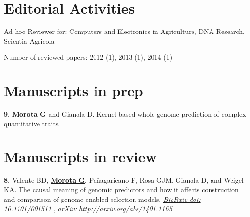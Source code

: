 \documentclass[margin,line,10pt]{res}
\newenvironment{list1}{
  \begin{list}{\ding{113}}{%
      \setlength{\itemsep}{0in}
      \setlength{\parsep}{0in} \setlength{\parskip}{0in}
      \setlength{\topsep}{0in} \setlength{\partopsep}{0in} 
      \setlength{\leftmargin}{0.17in}}}{\end{list}}
\begin{document}
\begin{resume}
\vspace{0.5cm}
\section{\sc Editorial Activities}
\vspace{.1cm}
Ad hoc Reviewer for: Computers and Electronics in Agriculture, DNA Research, Scientia Agricola
\vspace{.1cm}

Number of reviewed papers:
2012 (1), 2013 (1), 2014 (1) 


\vspace{0.5cm}
\section{\sc Manuscripts in prep}


\begin{list1}
\item [{\bf 9}.]  {\bf \underline{Morota G}} and Gianola D.   
     Kernel-based whole-genome prediction of complex quantitative traits. %


\end{list1}


\vspace{0.5cm}


\section{\sc Manuscripts in review}
\begin{list1}

\item [{\bf 8}.]  Valente BD, {\bf \underline{Morota G}}, Pe\~{n}agaricano F, Rosa GJM, Gianola D, and Weigel KA.   
     The causal meaning of genomic predictors and how it affects  construction and  
     comparison of genome-enabled selection models. 
\textcolor{blue}{\href{http://biorxiv.org/content/early/2013/12/21/001511}{{\it BioRxiv doi: 10.1101/001511 }}},  %
\hspace{2.7pt} \textcolor{blue}{\href{http://arxiv.org/abs/1401.1165}{{\it arXiv: http://arxiv.org/abs/1401.1165 }}} %

\vspace{0.5cm}

\end{list1}





\end{resume}
\end{document}
